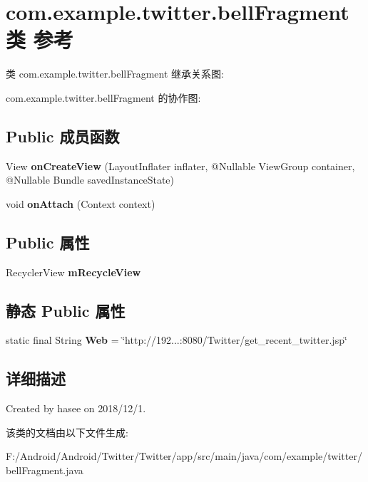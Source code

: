 \hypertarget{classcom_1_1example_1_1twitter_1_1bell_fragment}{}\section{com.\+example.\+twitter.\+bell\+Fragment类 参考}
\label{classcom_1_1example_1_1twitter_1_1bell_fragment}


类 com.\+example.\+twitter.\+bell\+Fragment 继承关系图\+:


com.\+example.\+twitter.\+bell\+Fragment 的协作图\+:
\subsection*{Public 成员函数}
\begin{DoxyCompactItemize}
\item 
\mbox{\label{classcom_1_1example_1_1twitter_1_1bell_fragment_a5670db547d67347c2f2a8bc901461af0}} 
View {\bfseries on\+Create\+View} (Layout\+Inflater inflater, @Nullable View\+Group container, @Nullable Bundle saved\+Instance\+State)
\item 
\mbox{\label{classcom_1_1example_1_1twitter_1_1bell_fragment_a44dfe9085778b9833bb39c7cd10bf61f}} 
void {\bfseries on\+Attach} (Context context)
\end{DoxyCompactItemize}
\subsection*{Public 属性}
\begin{DoxyCompactItemize}
\item 
\mbox{\label{classcom_1_1example_1_1twitter_1_1bell_fragment_a481d7dfea94709345a87ebc82c101caf}} 
Recycler\+View {\bfseries m\+Recycle\+View}
\end{DoxyCompactItemize}
\subsection*{静态 Public 属性}
\begin{DoxyCompactItemize}
\item 
\mbox{\label{classcom_1_1example_1_1twitter_1_1bell_fragment_ab405eac75e49e7844d530e7997f76628}} 
static final String {\bfseries Web} = \char`\"{}http\+://192...\+:8080/Twitter/get\+\_\+recent\+\_\+twitter.\+jsp\char`\"{}
\end{DoxyCompactItemize}


\subsection{详细描述}
Created by hasee on 2018/12/1. 

该类的文档由以下文件生成\+:\begin{DoxyCompactItemize}
\item 
F\+:/\+Android/\+Android/\+Twitter/\+Twitter/app/src/main/java/com/example/twitter/bell\+Fragment.\+java\end{DoxyCompactItemize}
